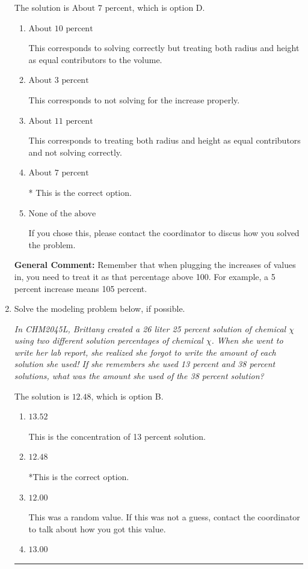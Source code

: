 \documentclass{extbook}[14pt]
\newcommand{\litem}[1]{\item #1

\rule{\textwidth}{0.4pt}}
\begin{document}
\begin{enumerate}
{The solution is \( \text{About } 7 \text{ percent} \), which is option D.\begin{enumerate}[label=\Alph*.]
\item \( \text{About } 10 \text{ percent} \)

This corresponds to solving correctly but treating both radius and height as equal contributors to the volume.
\item \( \text{About } 3 \text{ percent} \)

This corresponds to not solving for the increase properly.
\item \( \text{About } 11 \text{ percent} \)

This corresponds to treating both radius and height as equal contributors and not solving correctly.
\item \( \text{About } 7 \text{ percent} \)

* This is the correct option.
\item \( \text{None of the above} \)

If you chose this, please contact the coordinator to discus how you solved the problem.
\end{enumerate}

\textbf{General Comment:} Remember that when plugging the increases of values in, you need to treat it as that percentage above 100. For example, a 5 percent increase means 105 percent.
}
\litem{
Solve the modeling problem below, if possible.

\begin{center}
    \textit{ In CHM2045L, Brittany created a 26 liter 25 percent solution of chemical $\chi$ using two different solution percentages of chemical $\chi$. When she went to write her lab report, she realized she forgot to write the amount of each solution she used! If she remembers she used 13 percent and 38 percent solutions, what was the amount she used of the 38 percent solution? }
\end{center}


The solution is \( 12.48 \), which is option B.\begin{enumerate}[label=\Alph*.]
\item \( 13.52 \)

This is the concentration of 13 percent solution.
\item \( 12.48 \)

*This is the correct option.
\item \( 12.00 \)

This was a random value. If this was not a guess, contact the coordinator to talk about how you got this value.
\item \( 13.00 \)


\end{enumerate}}
\end{enumerate}
\end{document}
